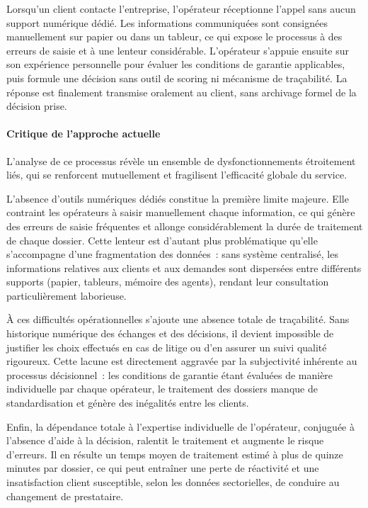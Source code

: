 \indent Lorsqu'un client contacte l'entreprise, l'op\'{e}rateur r\'{e}ceptionne l'appel sans aucun support num\'{e}rique d\'{e}di\'{e}. Les informations communiqu\'{e}es sont consign\'{e}es manuellement sur papier ou dans un tableur, ce qui expose le processus \`{a} des erreurs de saisie et \`{a} une lenteur consid\'{e}rable. L'op\'{e}rateur s'appuie ensuite sur son exp\'{e}rience personnelle pour \'{e}valuer les conditions de garantie applicables, puis formule une d\'{e}cision sans outil de scoring ni m\'{e}canisme de tra\c{c}abilit\'{e}. La r\'{e}ponse est finalement transmise oralement au client, sans archivage formel de la d\'{e}cision prise.

\paragraph{Critique de l'approche actuelle}

L'analyse de ce processus r\'{e}v\`{e}le un ensemble de dysfonctionnements \'{e}troitement li\'{e}s, qui se renforcent mutuellement et fragilisent l'efficacit\'{e} globale du service.

\indent L'absence d'outils num\'{e}riques d\'{e}di\'{e}s constitue la premi\`{e}re limite majeure. Elle contraint les op\'{e}rateurs \`{a} saisir manuellement chaque information, ce qui g\'{e}n\`{e}re des erreurs de saisie fr\'{e}quentes et allonge consid\'{e}rablement la dur\'{e}e de traitement de chaque dossier. Cette lenteur est d'autant plus probl\'{e}matique qu'elle s'accompagne d'une fragmentation des donn\'{e}es~: sans syst\`{e}me centralis\'{e}, les informations relatives aux clients et aux demandes sont dispers\'{e}es entre diff\'{e}rents supports (papier, tableurs, m\'{e}moire des agents), rendant leur consultation particuli\`{e}rement laborieuse.

\indent \`{A} ces difficult\'{e}s op\'{e}rationnelles s'ajoute une absence totale de tra\c{c}abilit\'{e}. Sans historique num\'{e}rique des \'{e}changes et des d\'{e}cisions, il devient impossible de justifier les choix effectu\'{e}s en cas de litige ou d'en assurer un suivi qualit\'{e} rigoureux. Cette lacune est directement aggrav\'{e}e par la subjectivit\'{e} inh\'{e}rente au processus d\'{e}cisionnel~: les conditions de garantie \'{e}tant \'{e}valu\'{e}es de mani\`{e}re individuelle par chaque op\'{e}rateur, le traitement des dossiers manque de standardisation et g\'{e}n\`{e}re des in\'{e}galit\'{e}s entre les clients.

\indent Enfin, la d\'{e}pendance totale \`{a} l'expertise individuelle de l'op\'{e}rateur, conjugu\'{e}e \`{a} l'absence d'aide \`{a} la d\'{e}cision, ralentit le traitement et augmente le risque d'erreurs. Il en r\'{e}sulte un temps moyen de traitement estim\'{e} \`{a} plus de quinze minutes par dossier, ce qui peut entra\^{i}ner une perte de r\'{e}activit\'{e} et une insatisfaction client susceptible, selon les donn\'{e}es sectorielles, de conduire au changement de prestataire.

